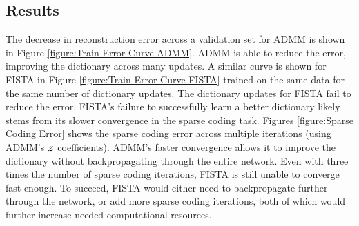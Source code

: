 \subsection{Results}
The decrease in reconstruction error across a validation set for ADMM is shown in Figure \ref{figure:Train Error Curve ADMM}. ADMM is able to reduce the error, improving the dictionary across many updates. A similar curve is shown for FISTA in Figure \ref{figure:Train Error Curve FISTA} trained on the same data for the same number of dictionary updates. The dictionary updates for FISTA fail to reduce the error. FISTA's failure to successfully learn a better dictionary likely stems from its slower convergence in the sparse coding task. Figures \ref{figure:Sparse Coding Error} shows the sparse coding error across multiple iterations (using ADMM's $\bm{z}$ coefficients). ADMM's faster convergence allows it to improve the dictionary without backpropagating through the entire network. Even with three times the number of sparse coding iterations, FISTA is still unable to converge fast enough. To succeed, FISTA would either need to backpropagate further through the network, or add more sparse coding iterations, both of which would further increase needed computational resources.
